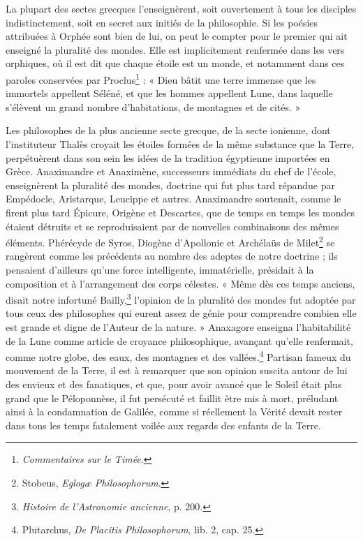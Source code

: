 \documentclass[a4paper, 11pt, oneside, landscape]{article}
\begin{document}
La plupart des sectes grecques l'enseignèrent, soit ouvertement à tous les disciples indistinctement, soit en secret aux initiés de la philosophie. Si les poésies attribuées à Orphée sont bien de lui, on peut le compter pour le premier qui ait enseigné la pluralité des mondes. Elle est implicitement renfermée dans les vers orphiques, où il est dit que chaque étoile est un monde, et notamment dans ces paroles conservées par Proclus\footnote{\emph{Commentaires sur le Timée}.} : « Dieu bâtit une terre immense que les immortels appellent Séléné, et que les hommes appellent Lune, dans laquelle s'élèvent un grand nombre d'habitations, de montagnes et de cités. »

Les philosophes de la plus ancienne secte grecque, de la secte ionienne, dont l'instituteur Thalès croyait les étoiles formées de la même substance que la Terre, perpétuèrent dans son sein les idées de la tradition égyptienne importées en Grèce. Anaximandre et Anaximène, successeurs immédiats du chef de l'école, enseignèrent la pluralité des mondes, doctrine qui fut plus tard répandue par Empédocle, Aristarque, Leucippe et autres. Anaximandre soutenait, comme le firent plus tard Épicure, Origène et Descartes, que de temps en temps les mondes étaient détruits et se reproduisaient par de nouvelles combinaisons des mêmes éléments. Phérécyde de Syros, Diogène d'Apollonie et Archélaüs de Milet\footnote{Stobeus, \emph{Eglogæ Philosophorum}.} se rangèrent comme les précédents au nombre des adeptes de notre doctrine ; ils pensaient d'ailleurs qu'une force intelligente, immatérielle, présidait à la composition et à l'arrangement des corps célestes. « Même dès ces temps anciens, disait notre infortuné Bailly,\footnote{\emph{Histoire de l'Astronomie ancienne}, p. 200.} l'opinion de la pluralité des mondes fut adoptée par tous ceux des philosophes qui eurent assez de génie pour comprendre combien elle est grande et digne de l'Auteur de la nature. » Anaxagore enseigna l'habitabilité de la Lune comme article de croyance philosophique, avançant qu'elle renfermait, comme notre globe, des eaux, des montagnes et des vallées.\footnote{Plutarchus, \emph{De Placitis Philosophorum}, lib. 2, cap. 25.} Partisan fameux du mouvement de la Terre, il est à remarquer que son opinion suscita autour de lui des envieux et des fanatiques, et que, pour avoir avancé que le Soleil était plus grand que le Péloponnèse, il fut persécuté et faillit être mis à mort, préludant ainsi à la condamnation de Galilée, comme si réellement la Vérité devait rester dans tons les temps fatalement voilée aux regards des enfants de la Terre.
\end{document}
